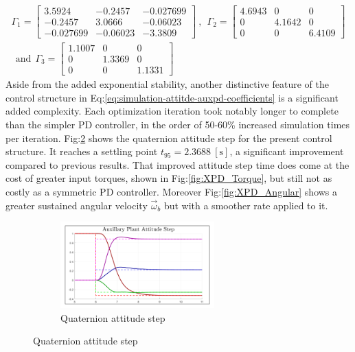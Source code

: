 \begin{multline}\label{eq:optimized-auxpd}
\Gamma_1=\begin{bmatrix}
3.5924 & -0.2457 & -0.027699\\
-0.2457 & 3.0666 & -0.06023\\
-0.027699 & -0.06023 & -3.3809
\end{bmatrix}~,~~\Gamma_2=\begin{bmatrix}
4.6943 & 0 & 0\\
0 & 4.1642 & 0\\
0 & 0 & 6.4109
\end{bmatrix}\\
~~\text{and}~~\Gamma_3=\begin{bmatrix}
1.1007 & 0 & 0\\
0 & 1.3369 & 0 \\
0 & 0 & 1.1331
\end{bmatrix}
\end{multline}
Aside from the added exponential stability, another distinctive feature of the control structure in Eq:\ref{eq:simulation-attitde-auxpd-coefficients} is a significant added complexity. Each optimization iteration took notably longer to complete than the simpler PD controller, in the order of 50-60\% increased simulation times per iteration. Fig:\ref{fig:XPD_Step} shows the quaternion attitude step for the present control structure. It reaches a settling point $t_{95}=2.3688~[\text{s}]$, a significant improvement compared to previous results. That improved attitude step time does come at the cost of greater input torques, shown in Fig:\ref{fig:XPD_Torque}, but still not as costly as a symmetric PD controller. Moreover Fig:\ref{fig:XPD_Angular} shows a greater sustained angular velocity $\vec{\omega}_b$ but with a smoother rate applied to it. 
\par
\begin{figure}[hbtp]
\centering
\begin{subfigure}{\textwidth}
\centering
\includegraphics[width=0.65\textwidth]{graphs/XPD_Step}
\caption{Quaternion attitude step}
\label{fig:XPD_Step}
\end{subfigure}
\end{figure}
